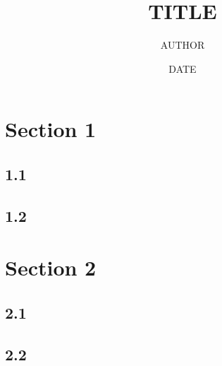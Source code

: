 \documentclass[letterpaper, 12pt]{article}
\title{TITLE}
\author{AUTHOR}
\date{DATE}
\begin{document}
    \maketitle

    \section{Section 1}
        \subsection{1.1}
        \subsection{1.2}
        
    \section{Section 2}
        \subsection{2.1}
        \subsection{2.2}
    
\end{document}
